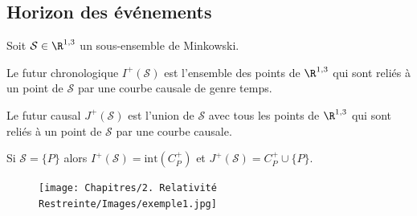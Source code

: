 \subsection{Horizon des événements} 

Soit $\mathcal{S} \in \R^{1,3}$  un sous-ensemble de Minkowski. 
\begin{theoremframe}
    \begin{defi}
        Le futur chronologique $I^{+}(\mathcal{S})$ est l'ensemble des points de $\R^{1,3}$ qui sont reliés à un point de $\mathcal{S}$ par une courbe causale de genre temps. 
    \end{defi}
\end{theoremframe}
\begin{theoremframe}
    \begin{defi}
        Le futur causal $J^{+}(\mathcal{S})$ est l'union de $\mathcal{S}$ avec tous les points de $\R^{1,3}$ qui sont reliés à un point de $\mathcal{S}$ par une courbe causale. 
    \end{defi}
\end{theoremframe}

\begin{exmp}
    Si $\mathcal{S} = \{P\}$ alors $I^{+}(\mathcal{S}) = \mathrm{int}( C_{P}^{+})$ et $J^{+}(\mathcal{S}) = C_{P}^{+} \cup \{P\}$. 
\begin{figure}[H]
    \centering
    \texttt{[image: Chapitres/2. Relativité Restreinte/Images/exemple1.jpg]}
    \caption{}
    \label{fig:2.6}
\end{figure}
\end{exmp}

